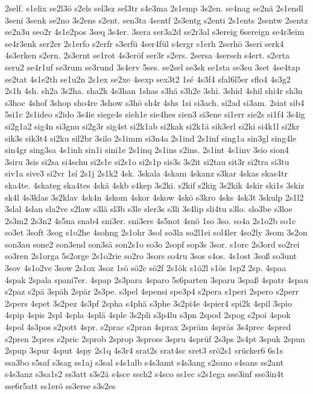 {2self.
s1elix
se2l3ö
s2els
sel3sz
sel3tr
s4e3ma
2s1emp
3s2en.
se4nag
se2nä
2s1endl
3seni
3senk
se2no
3s2ens
s2ent.
sen3ta
4sentf
2s3entg
s2enti
2s1ents
2sentw
2sentz
se2n3u
seo2r
4s1e2pos
3seq
3s4er.
3sera
ser3a2d
se2r3al
s3ereig
6sereign
se4r3eim
se4r3enk
ser2er
2s1erfo
s2erfr
s3erfü
4ser4fül
s4ergr
s1erh
2serhö
3seri
serk4
4s3erken
s2ern.
2s3ernt
se1rot
4s3eröf
ser3r
s2ers.
2sersa
4serseh
s4ert.
s2erta
seru2
se4r1uf
se3rum
se3rund
3s4erv
5ses.
se2sel
se3sk
se1sta
se3su
3set
4se4tap
se2tat
4s1e2th
se1u2n
2s1ex
se2xe
4sexp
sex3t2
1sé
4s3f4
sfal6l5er
sflo4
4s3g2
2s1h
4sh.
sh2a
3s2ha.
sha2k
4s3han
1shas
s3hä
s3h2e
3shi.
3shid
4shil
shi4r
sh3n
s3hoc
4shof
3shop
sho4re
3show
s3hö
sh4r
4shs
1si
si3ach.
si2ad
si3am.
2siat
sib4
5si1c
2s1ideo
s2ido
3s4ie
siege4s
sieh1e
sie4hes
sien3
si3ene
si1err
sie2s
si1f4
3s4ig
si2g1a2
sig4n
si3gnu
si2g3r
sig4st
si2k1ab
si2kak
si2k1ä
sik3erl
si2ki
si4k1l
si2kr
sik3s
sik3t4
si2ku
sil2br
3silo
2s1imm
si3n4a
2s1ind
2s1inf
sing1a
sin3gl
sing4le
sin4gr
sing3sa
4s1inh
sin1i
sini1e
2s1inq
2s1ins
s2ins.
2s1int
4s1inv
3sio
sion4
3siru
3sis
si2sa
si4schu
si2s1e
si2s1o
si2s1p
sis3s
3s2it
si2tau
sit3r
si2tra
si3tu
siv1a
sive3
si2vr
1sí
2s1j
2s1k2
4sk.
3skala
4skam
4skanz
s3kar
4skas
skas4tr
ska4te.
4skateg
ska4tes
4skä
4skb
s4kep
3s2ki.
s2kif
s2kig
3s2kik
4skir
ski1s
3skiz
sk4l
4s3klas
3s2klav
4sk4n
4skom
4skor
4skow
4skö
s3kro
4sks
4sk3t
3skulp
2s1l2
3slal
4slan
sla2ve
s2law
s3lä
sl3b
s3le
sler3s
s3li
3s4lip
sli4tu
s3lo.
slo3be
s3loe
2s3m2
2s3n2
4s5na
snab4
sni3er.
sni3ers
4s5not
4snö
1so
3so.
so4a
2s1o2b
so1c
so3et
3soft
3sog
s1o2he
4sohng
2s1ohr
3sol
so3la
so2l1ei
sol4ler
4so2ly
3som
3s2on
son3au
sone2
son3end
son3sä
son2s1o
so3o
2sopf
sop3s
3sor.
s1orc
2s3ord
so2rei
so3ren
2s1orga
5s2orge
2s1o2rie
so2ro
3sors
so4ru
3sos
s4os.
4s1ost
3soß
so3unt
3sov
4s1o2ve
3sow
2s1ox
3soz
1sö
sö2c
sö2f
2s1ök
s1ö2l
s1ös
1sp2
2sp.
4spaa
4spak
2spala
spani7er.
4spap
2s3para
4sparo
5s6parten
3sparu
3spaß
4spatr
4spau
s2paz
s2pä
3späh
2spär
2s3pe.
s3pel
4spensi
spe3p4
s2pera
s1peri
2spero
s2perr
2spers
4spet
3s2pez
4s3pf
2spha
s4phä
s3phe
3s2pi4e
4spier4
spi2k
4spil
3spio
4spip
4spis
2spl
4spla
4splä
4sple
3s2pli
s3p4lu
s3pn
2spod
2spog
s2poi
4spok
4spol
4s3pos
s2pott
4spr.
s2prac
s2pran
4sprax
2spräm
4spräs
3s4prec
4spred
s2pren
2spres
s2pric
2sprob
2sprop
3spross
3spru
4sprüf
2s3ps
2s4pt
3spuk
2spun
2spup
3spur
4sput
4spy
2s1q
4s3r4
srat2s
srat4sc
sret3
srö2s1
srücker6
6s1s
ssa3bo
s5saf
s3sag
ss1aj
s3sal
s4s1alb
s4s3amt
s4s3ang
s2sano
s4sans
ss2ant
s4s3anz
s3sa1s2
ss3att
s3s2ä
s4sce
ssch2
s4sco
ss1ec
s2s1ega
sse3inf
sse3in4t
sse6r5att
ss1erö
ss3erse
s3s2es
}
